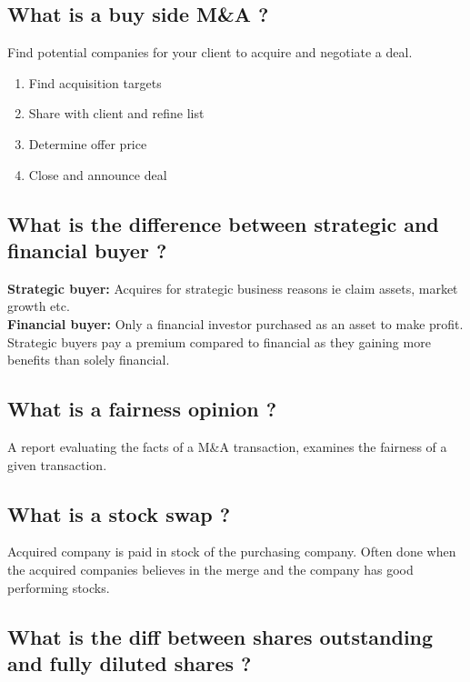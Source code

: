 \documentclass[11pt]{scrartcl} %
\begin{document}
\subsection{What is a buy side M\&A ?}

Find potential companies for your client to acquire and negotiate a deal.

\begin{enumerate}
	\item Find acquisition targets
	\item Share with client and refine list
	\item Determine offer price
	\item Close and announce deal
\end{enumerate}

\subsection{What is the difference between strategic and financial buyer ?}

\textbf{Strategic buyer:} Acquires for strategic business reasons ie claim assets, market growth etc.\\
\textbf{Financial buyer:} Only a financial investor purchased as an asset to make profit.\\

Strategic buyers pay a premium compared to financial as they gaining more benefits than solely financial.

\subsection{What is a fairness opinion ?}

A report evaluating the facts of a M\&A transaction, examines the fairness of a given transaction.

\subsection{What is a stock swap ?}

Acquired company is paid in stock of the purchasing company. Often done when the acquired companies believes in the merge and the company has good performing stocks. 

\subsection{What is the diff between shares outstanding and fully diluted shares ?}
\end{document}
